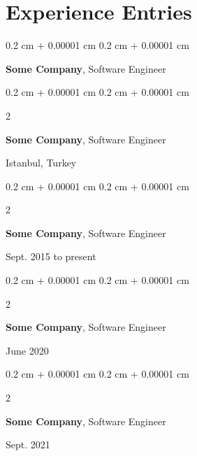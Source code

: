 \documentclass[10pt, letterpaper]{article}
\newenvironment{onecolentry}{
    \begin{adjustwidth}{
        0.2 cm + 0.00001 cm
    }{
        0.2 cm + 0.00001 cm
    }
}{
    \end{adjustwidth}
} %
\newenvironment{twocolentry}[2][]{
    \onecolentry
    \def\secondColumn{#2}
    \setcolumnwidth{\fill, 4.5 cm}
    \begin{paracol}{2}
}{
    \switchcolumn \raggedleft \secondColumn
    \end{paracol}
    \endonecolentry
} %
\begin{document}
    
    \section{Experience Entries}

        
        \begin{onecolentry}
            \textbf{Some \textnormal{Company}}, Software Engineer
        \end{onecolentry}


        \vspace{0.2 cm}

        \begin{twocolentry}{
            Istanbul, Turkey
        }
            \textbf{Some \textnormal{Company}}, Software Engineer
        \end{twocolentry}


        \vspace{0.2 cm}

        \begin{twocolentry}{
            Sept. 2015 to present
        }
            \textbf{Some \textnormal{Company}}, Software Engineer
        \end{twocolentry}


        \vspace{0.2 cm}

        \begin{twocolentry}{
            June 2020
        }
            \textbf{Some \textnormal{Company}}, Software Engineer
        \end{twocolentry}


        \vspace{0.2 cm}

        \begin{twocolentry}{
            Sept. 2021
        }
            \textbf{Some \textnormal{Company}}, Software Engineer
        \end{twocolentry}


        \vspace{0.2 cm}
\end{document}
